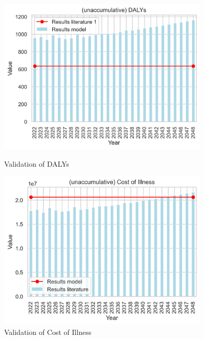 \begin{figure}[!h]
    \centering
    \begin{minipage}{0.45\textwidth}
        \centering
        \includegraphics[width=0.9\textwidth]{notebooks/dalys.png} %
        \caption{Validation of DALYs}
	    \label{fig:val_dalys}
    \end{minipage}\hfill
    \begin{minipage}{0.45\textwidth}
        \centering
        \includegraphics[width=0.9\textwidth]{notebooks/coi.png} %
        \caption{Validation of Cost of Illness}
	    \label{fig:val_coi}
    \end{minipage}
\end{figure}